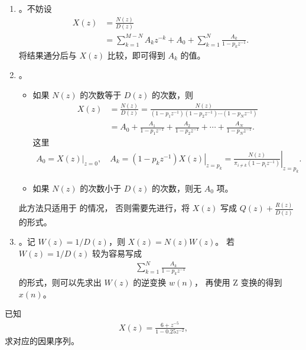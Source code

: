 \begin{enumerate}
    \item {}。不妨设
        \begin{align*}
            X(z) & = \frac{N(z)}{D(z)} \\
            & = \sum_{k = 1}^{M-N}A_kz^{-k} + A_0 + \sum_{k = 1}^{N}\frac{A_k}{1 - p_kz^{-1}}.
        \end{align*}
        将结果通分后与 $X(z)$ 比较，即可得到 $A_k$ 的值。
    \item {}。
        \begin{itemize}
            \item 如果 $N(z)$ 的次数等于 $D(z)$ 的次数，则
                \begin{align*}
                    X(z) & = \frac{N(z)}{D(z)} = \frac{N(z)}{(1 - p_1z^{-1})(1 - p_2z^{-1})\cdots(1 - p_Nz^{-1})} \\
                    & = A_0 + \frac{A_1}{1 - p_1z^{-1}} + \frac{A_2}{1 - p_2z^{-1}} + \cdots + \frac{A_N}{1 - p_Nz^{-1}}.
                \end{align*}
                这里
                \begin{align*}
                    A_0 = \left.X(z)\right|_{z = 0}, \quad A_k = \left.(1 - p_kz^{-1})X(z)\right|_{z = p_k} = \left.\frac{N(z)}{\pi_{i \neq k}(1 - p_iz^{-1})}\right|_{z = p_k}.
                \end{align*}
            \item 如果 $N(z)$ 的次数小于 $D(z)$ 的次数，则无 $A_0$ 项。
        \end{itemize}
        此方法只适用于 的情况，
        否则需要先进行，将 $X(z)$ 写成 $Q(z) + \frac{R(z)}{D(z)}$ 的形式。
    \item {}。记 $W(z) = 1/D(z)$，则 $X(z) = N(z)W(z)$。
        若 $W(z) = 1/D(z)$ 较为容易写成
        \begin{align*}
            \sum_{k = 1}^{N}\frac{A_k}{1 - p_kz^{-1}}
        \end{align*}
        的形式，则可以先求出 $W(z)$ 的逆变换 $w(n)$，
        再使用 Z 变换的得到 $x(n)$。
\end{enumerate}

\begin{exercise}
    已知
    \begin{align*}
        X(z) = \frac{6 + z^{-5}}{1 - 0.25z^{-2}},
    \end{align*}
    求对应的因果序列。
\end{exercise}

